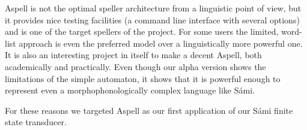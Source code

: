 Aspell is not the optimal speller architecture from a linguistic point of view, but it provides nice testing facilities (a command line interface with several options) and is one of the target spellers of the project. For some users the limited, word-list approach is even the preferred model over a linguistically more powerful one. It is also an interesting project in itself to make a decent Aspell, both academically and practically. Even though our alpha version shows the limitations of the simple automaton, it shows that it is powerful enough to represent even a morphophonologically complex language like S\'{a}mi.

For these reasons we targeted Aspell as our first application of our S\'{a}mi finite state transducer.






%
